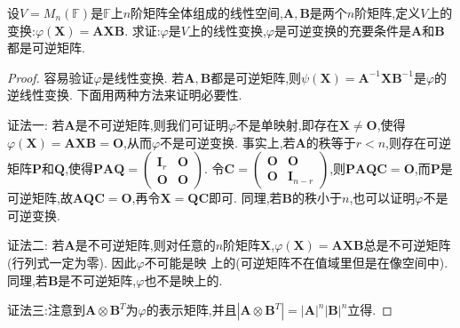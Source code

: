 \documentclass[../../main.tex]{subfiles}%
\begin{document}
\begin{example}
设\(V = M_n(\mathbb{F})\)是\(\mathbb{F}\)上\(n\)阶矩阵全体组成的线性空间,\(\boldsymbol{A},\boldsymbol{B}\)是两个\(n\)阶矩阵,定义\(V\)上的变换:\(\varphi(\boldsymbol{X})=\boldsymbol{A}\boldsymbol{X}\boldsymbol{B}\). 求证:\(\varphi\)是\(V\)上的线性变换,\(\varphi\)是可逆变换的充要条件是\(\boldsymbol{A}\)和\(\boldsymbol{B}\)都是可逆矩阵.
\end{example}
\begin{proof}
容易验证\(\varphi\)是线性变换. 若\(\boldsymbol{A},\boldsymbol{B}\)都是可逆矩阵,则\(\psi(\boldsymbol{X})=\boldsymbol{A}^{-1}\boldsymbol{X}\boldsymbol{B}^{-1}\)是\(\varphi\)的逆线性变换. 下面用两种方法来证明必要性.

{\color{blue}证法一:} 若\(\boldsymbol{A}\)是不可逆矩阵,则我们可证明\(\varphi\)不是单映射,即存在\(\boldsymbol{X}\neq\boldsymbol{O}\),使得\(\varphi(\boldsymbol{X})=\boldsymbol{A}\boldsymbol{X}\boldsymbol{B}=\boldsymbol{O}\),从而\(\varphi\)不是可逆变换. 事实上,若\(\boldsymbol{A}\)的秩等于\(r < n\),则存在可逆矩阵\(\boldsymbol{P}\)和\(\boldsymbol{Q}\),使得\(\boldsymbol{P}\boldsymbol{A}\boldsymbol{Q}=\begin{pmatrix}\boldsymbol{I}_r&\boldsymbol{O}\\\boldsymbol{O}&\boldsymbol{O}\end{pmatrix}\). 令\(\boldsymbol{C}=\begin{pmatrix}\boldsymbol{O}&\boldsymbol{O}\\\boldsymbol{O}&\boldsymbol{I}_{n - r}\end{pmatrix}\),则\(\boldsymbol{P}\boldsymbol{A}\boldsymbol{Q}\boldsymbol{C}=\boldsymbol{O}\),而\(\boldsymbol{P}\)是可逆矩阵,故\(\boldsymbol{A}\boldsymbol{Q}\boldsymbol{C}=\boldsymbol{O}\),再令\(\boldsymbol{X}=\boldsymbol{Q}\boldsymbol{C}\)即可. 同理,若\(\boldsymbol{B}\)的秩小于\(n\),也可以证明\(\varphi\)不是可逆变换.

{\color{blue}证法二:} 若\(\boldsymbol{A}\)是不可逆矩阵,则对任意的\(n\)阶矩阵\(\boldsymbol{X}\),\(\varphi(\boldsymbol{X})=\boldsymbol{A}\boldsymbol{X}\boldsymbol{B}\)总是不可逆矩阵(行列式一定为零). 因此\(\varphi\)不可能是映
上的(可逆矩阵不在值域里但是在像空间中). 同理,若\(\boldsymbol{B}\)是不可逆矩阵,\(\varphi\)也不是映上的.

{\color{blue}证法三:}注意到$\boldsymbol{A}\otimes \boldsymbol{B}^T$为$\varphi$的表示矩阵,并且$\left| \boldsymbol{A}\otimes \boldsymbol{B}^T \right|=\left| \boldsymbol{A} \right|^n\left| \boldsymbol{B} \right|^n$立得.
\end{proof}
\end{document}

